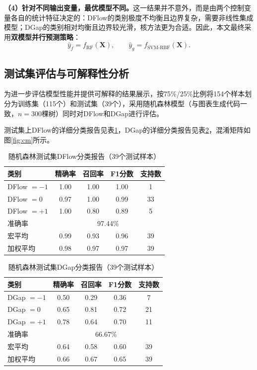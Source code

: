 \documentclass[UTF8,a4paper,12pt]{ctexart}
\begin{document}
\textbf{（4）针对不同输出变量，最优模型不同。}这一结果并不意外，而是由两个控制变量各自的统计特征决定的：DFlow的类别极度不均衡且边界复杂，需要非线性集成模型；DGap的类别相对均衡且边界较光滑，核方法更为合适。因此，本文最终采用\textbf{双模型并行预测策略}：
\begin{equation}
\hat{y}_f = f_{\text{RF}}(\bm{X}), \qquad \hat{y}_g = f_{\text{SVM-RBF}}(\bm{X}).
\label{eq:dual_model}
\end{equation}

\subsection{测试集评估与可解释性分析}

为进一步评估模型性能并提供可解释的结果展示，按75\%/25\%比例将154个样本划分为训练集（115个）和测试集（39个），采用随机森林模型（与图表生成代码一致，$n=300$棵树）同时对DFlow和DGap进行评估。

测试集上DFlow的详细分类报告见表\ref{tab:report_flow}，DGap的详细分类报告见表\ref{tab:report_gap}，混淆矩阵如图\ref{fig:cm}所示。

\begin{table}[H]
\centering
\caption{随机森林测试集DFlow分类报告（39个测试样本）}
\label{tab:report_flow}
\begin{tabular}{lcccc}
\toprule
类别 & 精确率 & 召回率 & F1分数 & 支持数 \\
\midrule
DFlow $= -1$ & 1.00 & 1.00 & 1.00 & 1 \\
DFlow $= 0$  & 0.97 & 1.00 & 0.99 & 33 \\
DFlow $= +1$ & 1.00 & 0.80 & 0.89 & 5 \\
\midrule
准确率 & \multicolumn{4}{c}{97.44\%} \\
宏平均 & 0.99 & 0.93 & 0.96 & 39 \\
加权平均 & 0.98 & 0.97 & 0.97 & 39 \\
\bottomrule
\end{tabular}
\end{table}

\begin{table}[H]
\centering
\caption{随机森林测试集DGap分类报告（39个测试样本）}
\label{tab:report_gap}
\begin{tabular}{lcccc}
\toprule
类别 & 精确率 & 召回率 & F1分数 & 支持数 \\
\midrule
DGap $= -1$ & 0.50 & 0.29 & 0.36 & 7 \\
DGap $= 0$  & 0.65 & 0.81 & 0.72 & 21 \\
DGap $= +1$ & 0.78 & 0.64 & 0.70 & 11 \\
\midrule
准确率 & \multicolumn{4}{c}{66.67\%} \\
宏平均 & 0.64 & 0.58 & 0.60 & 39 \\
加权平均 & 0.66 & 0.67 & 0.65 & 39 \\
\bottomrule
\end{tabular}
\end{table}
\end{document}
